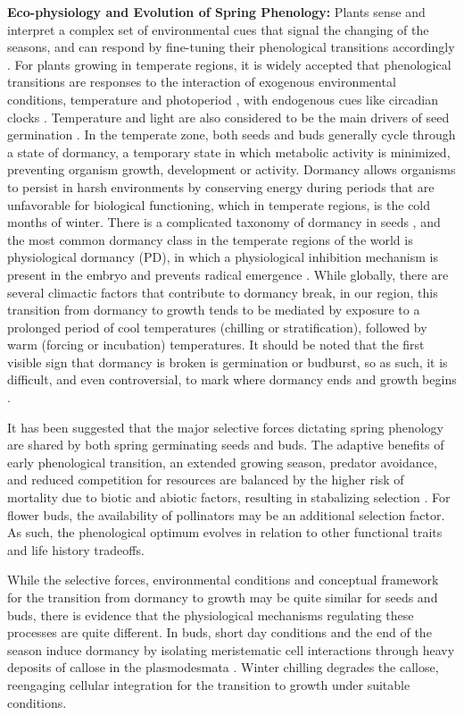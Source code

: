 \documentclass[12pt]{article}\usepackage[]{graphicx}\usepackage[]{color}
\begin{document}
\indent\indent\textbf{Eco-physiology and Evolution of Spring Phenology:} Plants sense and interpret a complex set of environmental cues that signal the changing of the seasons, and can respond by fine-tuning their phenological transitions accordingly \citep{Vitasse2010}. For plants growing in temperate regions, it is widely accepted that phenological transitions are responses to the interaction of exogenous environmental conditions, temperature and photoperiod \citep{Forrest2010}, with endogenous cues like circadian clocks \citep{Visser2010}. Temperature and light are also considered to be the main drivers of seed germination \citep{Finch-Savage2006}. In the temperate zone, both seeds and buds generally cycle through a state of dormancy, a temporary state in which metabolic activity is minimized, preventing organism growth, development or activity. Dormancy allows organisms to persist in harsh environments by conserving energy during periods that are unfavorable for biological functioning, which in temperate regions, is the cold months of winter. There is a complicated taxonomy of dormancy in seeds \citep{Baskin2004}, and the most common dormancy class in the temperate regions of the world is physiological dormancy (PD), in which a physiological inhibition mechanism is present in the embryo and prevents radical emergence \citep{Finch-Savage2006}. While globally, there are several climactic factors that contribute to dormancy break, in our region, this transition from dormancy to growth tends to be mediated by exposure to a prolonged period of cool temperatures (chilling or stratification), followed by warm (forcing or incubation) temperatures. It should be noted that the first visible sign that dormancy is broken is germination or budburst, so as such, it is difficult, and even controversial, to mark where dormancy ends and growth begins \citep{Long2015,Bewley1997}.
\par It has been suggested that the major selective forces dictating spring phenology are shared by both spring germinating seeds and buds. The adaptive benefits of early phenological transition, an extended growing season, predator avoidance, and reduced competition for resources are balanced by the higher risk of mortality due to biotic and abiotic factors, resulting in stabalizing selection \citep{Rathcke1985}. For flower buds, the availability of pollinators may be an additional selection factor. As such, the phenological optimum evolves in relation to other functional traits and life history tradeoffs. 
\par While the selective forces, environmental conditions and conceptual framework for the transition from dormancy to growth may be quite similar for seeds and buds, there is evidence that the physiological mechanisms regulating these processes are quite different. In buds, short day conditions and the end of the season induce dormancy by isolating meristematic cell interactions through heavy deposits of callose in the plasmodesmata \citep{Rinne2011,Sager2014}. Winter chilling degrades the callose, reengaging cellular integration for the transition to growth under suitable conditions. 
\end{document}

